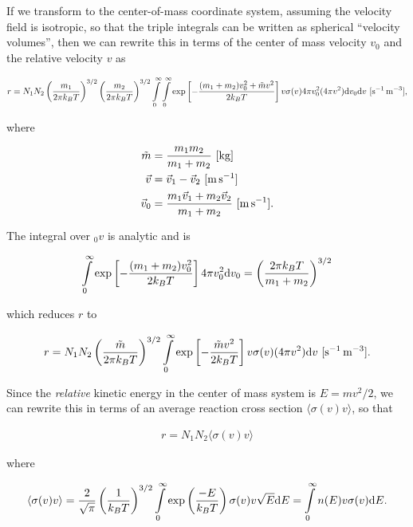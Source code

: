 \documentclass[a4paper,10pt]{article}
\begin{document}
{\noindent}If we transform to the center-of-mass coordinate system, assuming the velocity field is isotropic, so that the triple integrals can be written as spherical ``velocity volumes'', then we can rewrite this in terms of the center of
mass velocity $v_0$ and the relative velocity $v$ as

\begin{align*}
    r = N_1N_2 \left(\frac{m_1}{2\pi k_BT}\right)^{3/2} \left(\frac{m_2}{2\pi k_BT}\right)^{3/2} \int\limits_0^\infty \int\limits_0^\infty \exp\left[- \frac{(m_1+m_2)v_0^2+\tilde{m}v^2}{2k_BT} \right] v\sigma(v)4\pi v_0^2(4\pi v^2){\rm d}v_0{\rm d}v ~ [{\rm s^{-1}\,m^{-3}}],
\end{align*}

{\noindent}where

\begin{align*}
    \tilde{m} &= \frac{m_1m_2}{m_1+m_2} ~ [{\rm kg}] \\
    \vec{v}   &= \vec{v}_1-\vec{v}_2 ~ [{\rm m\,s^{-1}}] \\
    \vec{v}_0 &= \frac{m_1\vec{v}_1+m_2\vec{v}_2}{m_1+m_2} ~ [{\rm m\,s^{-1}}].
\end{align*}

{\noindent}The integral over $_0v$ is analytic and is

\begin{align*}
    \int\limits_0^\infty \exp\left[-\frac{(m_1+m_2)v_0^2}{2k_BT}\right] 4\pi v_0^2{\rm d}v_0 = \left(\frac{2\pi k_BT}{m_1+m_2}\right)^{3/2}
\end{align*}

{\noindent}which reduces $r$ to 

\begin{align*}
    r = N_1N_2 \left(\frac{\tilde{m}}{2\pi k_BT}\right)^{3/2} \int\limits_0^\infty \exp\left[-\frac{\tilde{m}v^2}{2k_BT}\right] v\sigma(v) (4\pi v^2) {\rm d}v ~ [{\rm s^{-1}\,m^{-3}}].
\end{align*}

{\noindent}Since the \textit{relative} kinetic energy in the center of mass system is $E=mv^2/2$, we can rewrite this in terms of an average reaction cross section $\langle\sigma(v)v\rangle$, so that

\begin{align*}
    r = N_1N_2\langle\sigma(v)v\rangle
\end{align*}

{\noindent}where

\begin{align*}
    \langle\sigma(v)v\rangle = \frac{2}{\sqrt{\pi}} \left(\frac{1}{k_BT}\right)^{3/2} \int\limits_0^\infty \exp\left(\frac{-E}{k_BT}\right)\sigma(v)v\sqrt{E}{\rm d}E = \int\limits_0^\infty n(E)v\sigma(v){\rm d}E.
\end{align*}
\end{document}
